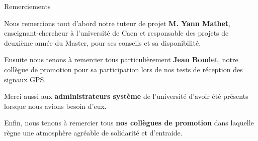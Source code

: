 {\Huge{Remerciements}}

\vspace{2cm}
Nous remercions tout d'abord notre tuteur de projet {\bfseries M. Yann Mathet}, enseignant-chercheur à l'université de Caen et responsable des projets de deuxième année du Master, pour ses conseils et sa disponibilité.\bigskip

Ensuite nous tenons à remercier tous particulièrement {\bfseries Jean Boudet}, notre collègue de promotion pour sa participation lors de nos tests de réception des signaux GPS.\bigskip

Merci aussi aux {\bfseries administrateurs système} de l'université d'avoir été présents lorsque nous avions besoin d'eux.\bigskip

Enfin, nous tenons à remercier tous {\bfseries nos collègues de promotion} dans laquelle règne une atmosphère agréable de solidarité et d'entraide.\bigskip

